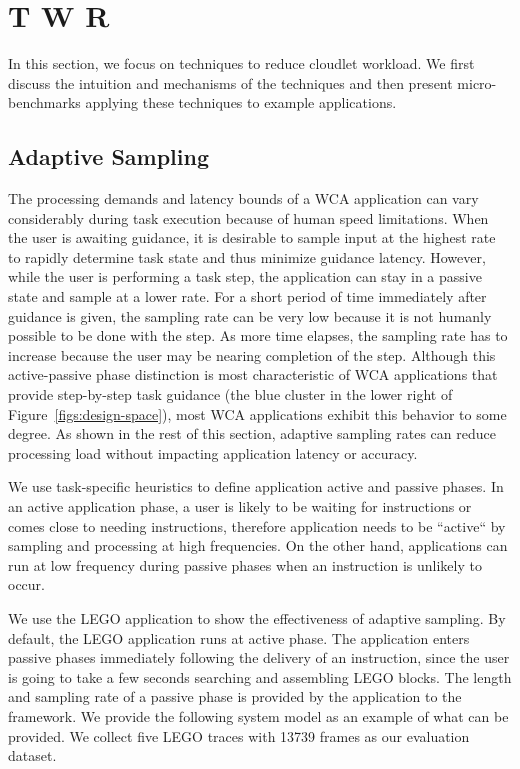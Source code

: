 \section{T  W R}

\label{sec: workload-reduction}

In this section, we focus on techniques to reduce cloudlet workload. We first
discuss the intuition and mechanisms of the techniques and then present
micro-benchmarks applying these techniques to example applications.

\subsection{Adaptive Sampling}


The processing demands and latency bounds of a WCA application can
vary considerably during task execution because of human speed
limitations.  When the user is awaiting guidance, it is desirable to
sample input at the highest rate to rapidly determine task state and
thus minimize guidance latency.  However, while the user is performing
a task step, the application can stay in a passive state and sample at
a lower rate.  For a short period of time immediately after guidance
is given, the sampling rate can be very low because it is not humanly
possible to be done with the step.  As more time elapses, the
sampling rate has to increase because the user may be nearing
completion of the step.  Although this active-passive phase
distinction is most characteristic of WCA applications that provide
step-by-step task guidance (the blue cluster in
the lower right of Figure~\ref{figs:design-space}), most WCA
applications exhibit this behavior to some degree.  As shown in the
rest of this section, adaptive sampling rates can reduce processing
load without impacting application latency or accuracy.

We use task-specific heuristics to define application active and
passive phases.  In an active application phase, a user is likely to
be waiting for instructions or comes close to needing instructions,
therefore application needs to be ``active`` by sampling and
processing at high frequencies. On the other hand, applications can
run at low frequency during passive phases when an instruction is
unlikely to occur.

We use the LEGO application to show the effectiveness of adaptive
sampling. By default, the LEGO application runs at active phase. The
application enters passive phases immediately following the delivery
of an instruction, since the user is going to take a few seconds
searching and assembling LEGO blocks. The length and sampling rate of
a passive phase is provided by the application to the framework. We
provide the following system model as an example of what can be
provided. We collect five LEGO traces with 13739 frames as our
evaluation dataset.


